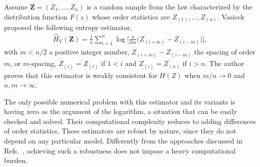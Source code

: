 \documentclass[journal]{IEEEtran}
\begin{document}
Assume $\bm Z =(Z_1,\dots,Z_n)$ is a random sample from the law characterized by the distribution function $F(z)$ whose order statistics are $Z_{(1)}, \ldots, Z_{(n)}$. 
Vasicek~\cite{Vasicek76} proposed the following entropy estimator,
\begin{align}
	\label{HV}
	\widehat{H}_{\text{V}}(\bm Z)=\frac{1}{n} \sum_{i=1}^{n} \log \Big[\frac{n}{2 m}\big(Z_{(i+m)}-Z_{(i-m)}\big)\Big], 
\end{align}
with $m<n/2$ a positive integer number, 
$Z_{(i+m)}-Z_{(i-m)}$ the spacing of order $m$, or $m$-spacing, 
$Z_{(i)}=Z_{(i)}$ if $1<i$ and $Z_{(i)}=Z_{(n)}$ if $i>n$.
The author proves that this estimator is weakly consistent for $H(Z)$ when $m/n \to 0$ and $n,m \to \infty$.

The only possible numerical problem with this estimator and its variants is having zero as the argument of the logarithm, a situation that can be easily checked and solved.
Their computational complexity reduces to adding differences of order statistics.
These estimators are robust by nature, since they do not depend on any particular model.
Differently from the approaches discussed in Refs.~\cite{BustosFreryLucini:Mestimators:2001,AllendeFreryetal:JSCS:05,gambini2015}, achieving such a robustness does not impose a heavy computational burden.
\end{document}
